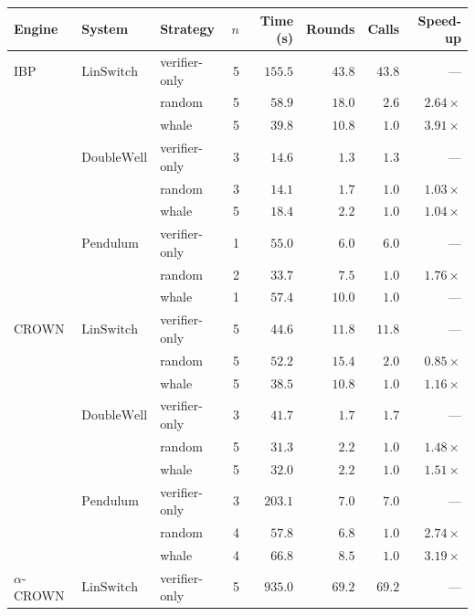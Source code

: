\begin{table}[h]
\centering
\begin{tabular}{lllrrrrr}
\hline
Engine & System & Strategy & $n$ & Time (s) & Rounds & Calls & Speed-up \\
\hline
IBP & $\mathrm{LinSwitch}$     & verifier-only & 5 & $155.5$ & $43.8$ & $43.8$ & --- \\
    &                 & random        & 5 & $58.9$  & $18.0$ & $2.6$  & $2.64\times$ \\
    &                 & whale         & 5 & $39.8$  & $10.8$ & $1.0$  & $3.91\times$ \\
    & $\mathrm{DoubleWell}$     & verifier-only & 3 & $14.6$  & $1.3$  & $1.3$  & --- \\
    &                 & random        & 3 & $14.1$  & $1.7$  & $1.0$  & $1.03\times$ \\
    &                 & whale         & 5 & $18.4$  & $2.2$  & $1.0$  & $1.04\times$ \\
    & $\mathrm{Pendulum}$  & verifier-only & 1 & $55.0$  & $6.0$  & $6.0$  & --- \\
    &                 & random        & 2 & $33.7$  & $7.5$  & $1.0$  & $1.76\times$ \\
    &                 & whale         & 1 & $57.4$  & $10.0$ & $1.0$  & --- \\
\hline
CROWN & $\mathrm{LinSwitch}$     & verifier-only & 5 & $44.6$  & $11.8$ & $11.8$ & --- \\
      &                 & random        & 5 & $52.2$  & $15.4$ & $2.0$  & $0.85\times$ \\
      &                 & whale         & 5 & $38.5$  & $10.8$ & $1.0$  & $1.16\times$ \\
      & $\mathrm{DoubleWell}$     & verifier-only & 3 & $41.7$  & $1.7$  & $1.7$  & --- \\
      &                 & random        & 5 & $31.3$  & $2.2$  & $1.0$  & $1.48\times$ \\
      &                 & whale         & 5 & $32.0$  & $2.2$  & $1.0$  & $1.51\times$ \\
      & $\mathrm{Pendulum}$  & verifier-only & 3 & $203.1$ & $7.0$  & $7.0$  & --- \\
      &                 & random        & 4 & $57.8$  & $6.8$  & $1.0$  & $2.74\times$ \\
      &                 & whale         & 4 & $66.8$  & $8.5$  & $1.0$  & $3.19\times$ \\
\hline
$\alpha$-CROWN & $\mathrm{LinSwitch}$  & verifier-only & 5 & $935.0$  & $69.2$ & $69.2$ & --- \\

\end{tabular}
\end{table}
